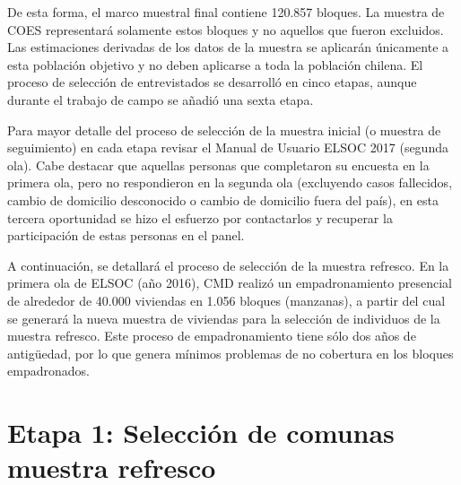 \documentclass[
  openany]{book}
\begin{document}
De esta forma, el marco muestral final contiene 120.857 bloques. La muestra de COES representará solamente estos bloques y no aquellos que fueron excluidos. Las estimaciones derivadas de los datos de la muestra se aplicarán únicamente a esta población objetivo y no deben aplicarse a toda la población chilena. El proceso de selección de entrevistados se desarrolló en cinco etapas, aunque durante el trabajo de campo se añadió una sexta etapa.

Para mayor detalle del proceso de selección de la muestra inicial (o muestra de seguimiento) en cada etapa revisar el Manual de Usuario ELSOC 2017 (segunda ola). Cabe destacar que aquellas personas que completaron su encuesta en la primera ola, pero no respondieron en la segunda ola (excluyendo casos fallecidos, cambio de domicilio desconocido o cambio de domicilio fuera del país), en esta tercera oportunidad se hizo el esfuerzo por contactarlos y recuperar la participación de estas personas en el panel.

A continuación, se detallará el proceso de selección de la muestra refresco. En la primera ola de ELSOC (año 2016), CMD realizó un empadronamiento presencial de alrededor de 40.000 viviendas en 1.056 bloques (manzanas), a partir del cual se generará la nueva muestra de viviendas para la selección de individuos de la muestra refresco. Este proceso de empadronamiento tiene sólo dos años de antigüedad, por lo que genera mínimos problemas de no cobertura en los bloques empadronados.

\hypertarget{etapa-1-selecciuxf3n-de-comunas-muestra-refresco}{%
\section{Etapa 1: Selección de comunas muestra refresco}\label{etapa-1-selecciuxf3n-de-comunas-muestra-refresco}}
\end{document}
